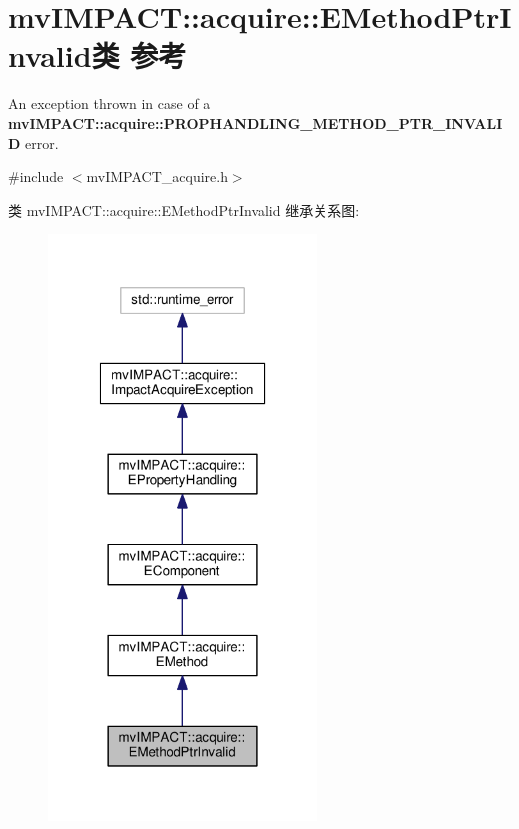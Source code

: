 \hypertarget{classmv_i_m_p_a_c_t_1_1acquire_1_1_e_method_ptr_invalid}{\section{mv\+I\+M\+P\+A\+C\+T\+:\+:acquire\+:\+:E\+Method\+Ptr\+Invalid类 参考}
\label{classmv_i_m_p_a_c_t_1_1acquire_1_1_e_method_ptr_invalid}
}


An exception thrown in case of a {\bfseries mv\+I\+M\+P\+A\+C\+T\+::acquire\+::\+P\+R\+O\+P\+H\+A\+N\+D\+L\+I\+N\+G\+\_\+\+M\+E\+T\+H\+O\+D\+\_\+\+P\+T\+R\+\_\+\+I\+N\+V\+A\+L\+I\+D} error.  




{\ttfamily \#include $<$mv\+I\+M\+P\+A\+C\+T\+\_\+acquire.\+h$>$}



类 mv\+I\+M\+P\+A\+C\+T\+:\+:acquire\+:\+:E\+Method\+Ptr\+Invalid 继承关系图\+:
\nopagebreak
\begin{figure}[H]
\begin{center}
\leavevmode
\includegraphics[width=202pt]{classmv_i_m_p_a_c_t_1_1acquire_1_1_e_method_ptr_invalid__inherit__graph}
\end{center}
\end{figure}


